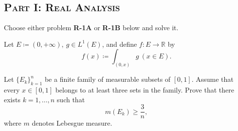 \documentclass{exam}
\renewcommand{\questionlabel}{\textbf{R-1.A.}}
\begin{document}
\begin{center}

\vspace{1em}

\section*{\textsc{Part I: Real Analysis}}
\end{center}
\vspace*{1cm}
Choose either problem \textbf{R-1A} or \textbf{R-1B} below and solve it.\\

\begin{questions}
    \question[10]
        Let $E\coloneq (0, +\infty),\ g\in L^1(E)$, and define $f: E\to \mathbb{R}$ by 
        \[f(x)\coloneq\int_{(0,x)}g \ (x\in E).\]

        \renewcommand{\questionlabel}{\textbf{R-1B.}}

    \question[10]
        Let $\{E_k\}_{k=1}^n$ be a finite family of measurable subsets of $[0,1]$. Assume that every $x\in [0,1]$ belongs to at least three sets in the family. 
        Prove that there exists $k = 1, \dots, n$ such that 
        \[m(E_k)\geq\frac{3}{n},\]
        where $m$ denotes Lebesgue measure.\\


\end{questions}
\end{document}
